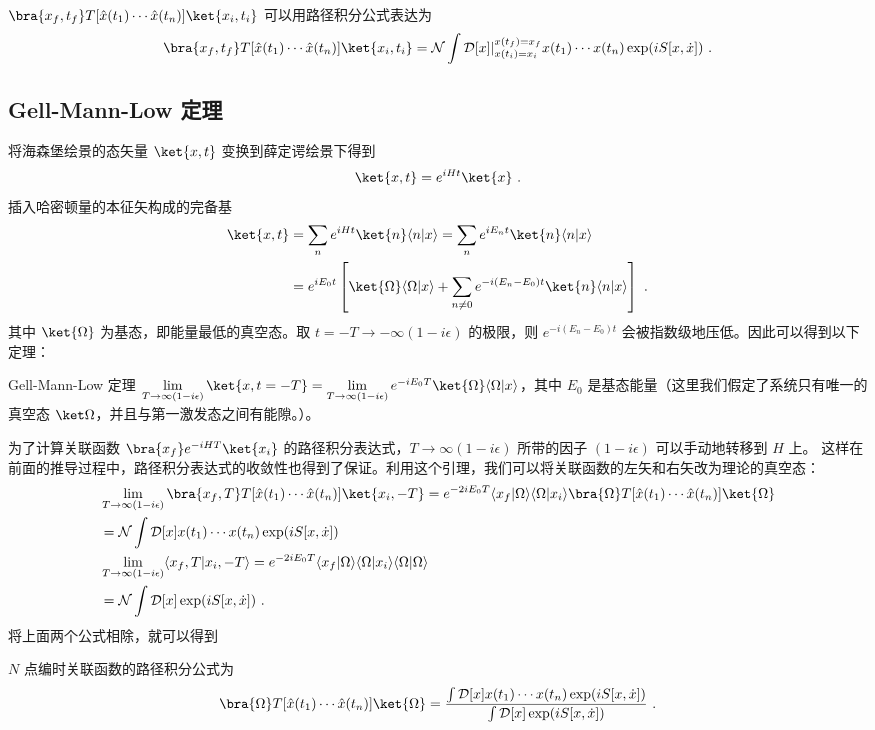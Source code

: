\begin{theorem}{}
$\bra{x_f,t_f} T[\hat x(t_1)\cdots \hat x(t_n)]\ket{x_i,t_i}$ 可以用路径积分公式表达为
\begin{equation}
        \bra{x_f,t_f} T[\hat x(t_1)\cdots \hat x(t_n)]\ket{x_i,t_i}=
        \mathcal{N}\int \mathcal{D}[x]|_{x(t_i)=x_i}^{x(t_f)=x_f} x(t_1)\cdots x(t_n) \exp(i S[x,\dot x])~.
\end{equation}
\end{theorem}

\subsection{Gell-Mann-Low 定理}
将海森堡绘景的态矢量 $\ket{x,t}$ 变换到薛定谔绘景下得到
\begin{equation}
\ket{x,t}=e^{iHt}\ket{x}~.
\end{equation}
插入哈密顿量的本征矢构成的完备基
\begin{equation}
\begin{aligned}
\ket{x,t}&=\sum_n e^{iHt}\ket{n}\langle n|x\rangle=
\sum_n e^{iE_n t}\ket{n}\langle n|x\rangle\\
&=e^{iE_0t}\left[\ket{\Omega}\langle\Omega|x\rangle+\sum_{n\neq 0}e^{-i(E_n-E_0)t}\ket{n}\langle n|x\rangle\right]~.
\end{aligned}
\end{equation}
其中 $\ket{\Omega}$ 为基态，即能量最低的真空态。取 $t=-T\rightarrow -\infty(1-i\epsilon)$ 的极限，则 $e^{-i(E_n-E_0) t}$ 会被指数级地压低。因此可以得到以下定理：
\begin{theorem}{Gell-Mann-Low 定理}
$\lim\limits_{T\rightarrow \infty(1-i\epsilon)}\ket{x,t=-T}=
    \lim\limits_{T\rightarrow \infty(1-i\epsilon)}
    e^{-iE_0T}\ket{\Omega}\langle \Omega|x\rangle$，其中 $E_0$ 是基态能量（这里我们假定了系统只有唯一的真空态 $\ket \Omega$，并且与第一激发态之间有能隙。）。
\end{theorem}
为了计算关联函数 $\bra{x_f}e^{-iHT}\ket{x_i}$ 的路径积分表达式，$T\rightarrow \infty(1-i\epsilon)$ 所带的因子 $(1-i\epsilon)$ 可以手动地转移到 $H$ 上。
这样在前面的推导过程中，路径积分表达式的收敛性也得到了保证。利用这个引理，我们可以将关联函数的左矢和右矢改为理论的真空态：
\begin{equation}
\begin{aligned}
&\lim\limits_{T\rightarrow \infty(1-i\epsilon)}
\bra{x_f,T} T[\hat x(t_1)\cdots \hat x(t_n)]\ket{x_i,-T}=
e^{-2iE_0T}\langle x_f | \Omega \rangle\langle\Omega|x_i\rangle\bra{\Omega} T[\hat x(t_1)\cdots \hat x(t_n)]\ket{\Omega}\\
&=\mathcal{N}\int \mathcal{D}[x] x(t_1)\cdots x(t_n) \exp(i S[x,\dot x])\\
&\lim\limits_{T\rightarrow \infty(1-i\epsilon)}
\langle x_f,T| x_i,-T\rangle=e^{-2iE_0T}\langle x_f | \Omega \rangle\langle\Omega|x_i\rangle\langle\Omega|\Omega\rangle\\
&=\mathcal{N}\int \mathcal{D}[x] \exp(i S[x,\dot x])~.
\end{aligned}
\end{equation}
将上面两个公式相除，就可以得到
\begin{theorem}{}
$N$ 点编时关联函数的路径积分公式为
\begin{equation}
\bra{\Omega} T[\hat x(t_1)\cdots \hat x(t_n)]\ket{\Omega}
=\frac{\int \mathcal{D}[x] x(t_1)\cdots x(t_n) \exp(i S[x,\dot x])}
{\int \mathcal{D}[x]\exp(i S[x,\dot x])}~.
\end{equation}
\end{theorem}
